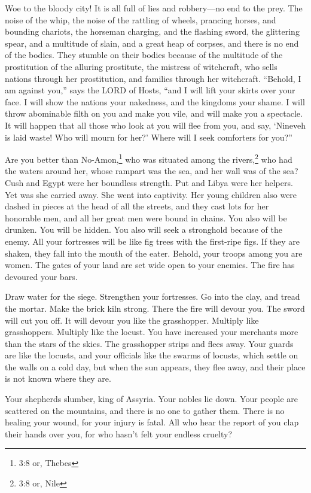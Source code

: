 \mychapter{} \myverse*{}Woe to the bloody city! It is all full of lies and robbery—no end
to the prey.
\myverse{}The noise of the whip, the noise of the rattling of wheels, prancing horses,
and bounding chariots,
\myverse{}the horseman charging, and the flashing sword, the glittering spear, and a multitude
of slain, and a great heap of corpses, and there is no end of the bodies. They stumble on their bodies
\myverse{}because of the multitude of the prostitution of the alluring prostitute, the
mistress of witchcraft, who sells nations through her prostitution, and families through her witchcraft.
\myverse{}“Behold, I am against you,” says the LORD of Hosts, “and I will lift your skirts
over your face. I will show the nations your nakedness, and the kingdoms your shame.
\myverse{}I will throw abominable filth on you and make you vile, and will make you a
spectacle.
\myverse{}It will happen that all those who look at you will flee from you, and say, ‘Nineveh
is laid waste! Who will mourn for her?’ Where will I seek comforters for you?”

\myverse{}Are you better than No-Amon,\footnote{3:8 or, Thebes} who was situated among the rivers,\footnote{3:8 or, Nile} who had the waters around her, whose rampart was the sea, and her wall was
of the sea?
\myverse{}Cush and Egypt were her boundless strength. Put and Libya were her helpers.
\myverse{}Yet was she carried away. She went into captivity. Her young children also
were dashed in pieces at the head of all the streets, and they cast lots for her honorable men, and all
her great men were bound in chains.
\myverse{}You also will be drunken. You will be hidden. You also will seek a stronghold
because of the enemy.
\myverse{}All your fortresses will be like fig trees with the first-ripe figs. If they
are shaken, they fall into the mouth of the eater.
\myverse{}Behold, your troops among you are women. The gates of your land are set wide
open to your enemies. The fire has devoured your bars.

\myverse{}Draw water for the siege. Strengthen your fortresses. Go into
the clay, and tread the mortar. Make the brick kiln strong.
\myverse{}There the fire will devour you. The sword will cut you off. It will devour
you like the grasshopper. Multiply like grasshoppers. Multiply like the locust.
\myverse{}You have increased your merchants more than the stars of the skies. The grasshopper
strips and flees away.
\myverse{}Your guards are like the locusts, and your officials like the swarms of locusts,
which settle on the walls on a cold day, but when the sun appears, they flee away, and their place is
not known where they are.

\myverse{}Your shepherds slumber, king of Assyria. Your nobles lie down.
Your people are scattered on the mountains, and there is no one to gather them.
\myverse{}There is no healing your wound, for your injury is fatal. All who hear the
report of you clap their hands over you, for who hasn’t felt your endless cruelty?


